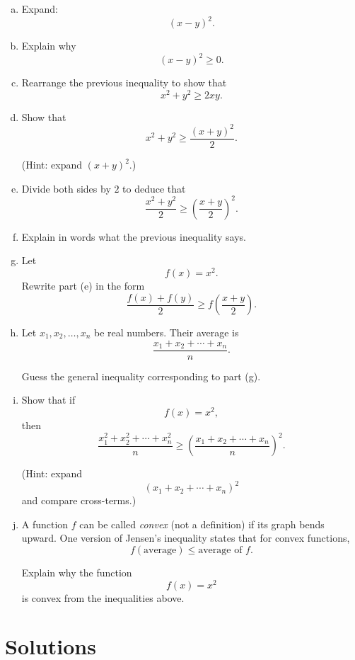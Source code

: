 \documentclass[12pt]{article}
\begin{document}
\begin{enumerate}[(a)]

\item Expand:
\[
(x-y)^2.
\]

\item Explain why
\[
(x-y)^2 \geq 0.
\]

\item Rearrange the previous inequality to show that
\[
x^2+y^2 \geq 2xy.
\]

\item Show that
\[
x^2+y^2
\geq
\frac{(x+y)^2}{2}.
\]

(Hint: expand $(x+y)^2$.)

\item Divide both sides by $2$ to deduce that
\[
\frac{x^2+y^2}{2}
\geq
\left(\frac{x+y}{2}\right)^2.
\]

\item Explain in words what the previous inequality says.

\item Let
\[
f(x)=x^2.
\]
Rewrite part (e) in the form
\[
\frac{f(x)+f(y)}{2}
\geq
f\left(\frac{x+y}{2}\right).
\]

\item Let $x_1,x_2,\dots,x_n$ be real numbers.
Their average is
\[
\frac{x_1+x_2+\cdots+x_n}{n}.
\]

Guess the general inequality corresponding to part (g).

\item Show that if
\[
f(x)=x^2,
\]
then
\[
\frac{x_1^2+x_2^2+\cdots+x_n^2}{n}
\geq
\left(
\frac{x_1+x_2+\cdots+x_n}{n}
\right)^2.
\]

(Hint: expand
\[
(x_1+x_2+\cdots+x_n)^2
\]
and compare cross-terms.)

\item A function $f$ can be called \textit{convex} (not a definition) if its graph bends upward.
One version of Jensen's inequality states that for convex functions,
\[
f(\text{average})
\leq
\text{average of } f.
\]

Explain why the function
\[
f(x)=x^2
\]
is convex from the inequalities above.

\end{enumerate}

\newpage
\section*{Solutions}
\end{document}
